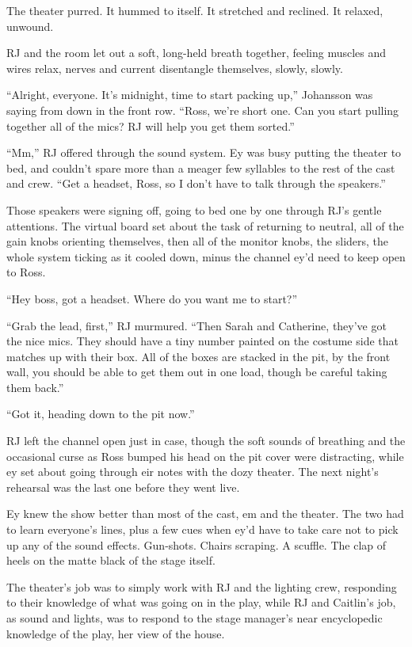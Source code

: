 The theater purred. It hummed to itself. It stretched and reclined. It relaxed, unwound.

RJ and the room let out a soft, long-held breath together, feeling muscles and wires relax, nerves and current disentangle themselves, slowly, slowly.

``Alright, everyone. It's midnight, time to start packing up,'' Johansson was saying from down in the front row. ``Ross, we're short one. Can you start pulling together all of the mics? RJ will help you get them sorted.''

``Mm,'' RJ offered through the sound system. Ey was busy putting the theater to bed, and couldn't spare more than a meager few syllables to the rest of the cast and crew. ``Get a headset, Ross, so I don't have to talk through the speakers.''

Those speakers were signing off, going to bed one by one through RJ's gentle attentions. The virtual board set about the task of returning to neutral, all of the gain knobs orienting themselves, then all of the monitor knobs, the sliders, the whole system ticking as it cooled down, minus the channel ey'd need to keep open to Ross.

``Hey boss, got a headset. Where do you want me to start?''

``Grab the lead, first,'' RJ murmured. ``Then Sarah and Catherine, they've got the nice mics. They should have a tiny number painted on the costume side that matches up with their box. All of the boxes are stacked in the pit, by the front wall, you should be able to get them out in one load, though be careful taking them back.''

``Got it, heading down to the pit now.''

RJ left the channel open just in case, though the soft sounds of breathing and the occasional curse as Ross bumped his head on the pit cover were distracting, while ey set about going through eir notes with the dozy theater. The next night's rehearsal was the last one before they went live.

Ey knew the show better than most of the cast, em and the theater. The two had to learn everyone's lines, plus a few cues when ey'd have to take care not to pick up any of the sound effects. Gun-shots. Chairs scraping. A scuffle. The clap of heels on the matte black of the stage itself.

The theater's job was to simply work with RJ and the lighting crew, responding to their knowledge of what was going on in the play, while RJ and Caitlin's job, as sound and lights, was to respond to the stage manager's near encyclopedic knowledge of the play, her view of the house.

